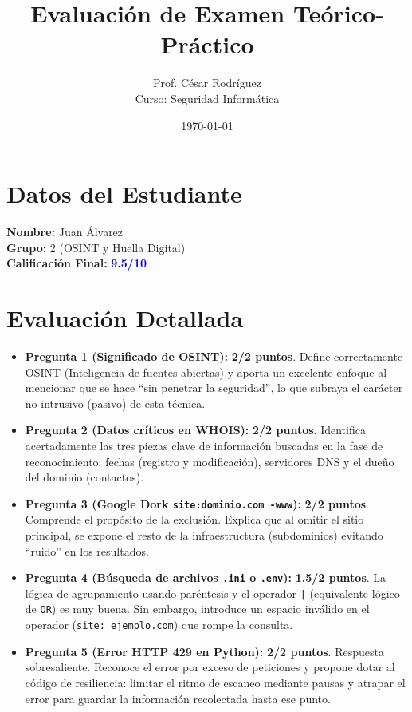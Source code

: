 \documentclass[12pt,a4paper]{article}
\title{Evaluación de Examen Teórico-Práctico}
\author{Prof. César Rodríguez \\ \small Curso: Seguridad Informática}
\date{\today}
\begin{document}
\maketitle

\section*{Datos del Estudiante}
\textbf{Nombre:} Juan Álvarez \\
\textbf{Grupo:} 2 (OSINT y Huella Digital) \\
\textbf{Calificación Final:} \textbf{\textcolor{blue}{9.5/10}}

\section*{Evaluación Detallada}

\begin{itemize}[label=$\bullet$]
    \item \textbf{Pregunta 1 (Significado de OSINT):} \textbf{2/2 puntos}. Define correctamente OSINT (Inteligencia de fuentes abiertas) y aporta un excelente enfoque al mencionar que se hace ``sin penetrar la seguridad'', lo que subraya el carácter no intrusivo (pasivo) de esta técnica.
    
    \item \textbf{Pregunta 2 (Datos críticos en WHOIS):} \textbf{2/2 puntos}. Identifica acertadamente las tres piezas clave de información buscadas en la fase de reconocimiento: fechas (registro y modificación), servidores DNS y el dueño del dominio (contactos).
    
    \item \textbf{Pregunta 3 (Google Dork \texttt{site:dominio.com -www}):} \textbf{2/2 puntos}. Comprende el propósito de la exclusión. Explica que al omitir el sitio principal, se expone el resto de la infraestructura (subdominios) evitando ``ruido'' en los resultados.
    
    \item \textbf{Pregunta 4 (Búsqueda de archivos \texttt{.ini} o \texttt{.env}):} \textbf{1.5/2 puntos}. La lógica de agrupamiento usando paréntesis y el operador \texttt{|} (equivalente lógico de \texttt{OR}) es muy buena. Sin embargo, introduce un espacio inválido en el operador (\texttt{site: ejemplo.com}) que rompe la consulta.
    
    \item \textbf{Pregunta 5 (Error HTTP 429 en Python):} \textbf{2/2 puntos}. Respuesta sobresaliente. Reconoce el error por exceso de peticiones y propone dotar al código de resiliencia: limitar el ritmo de escaneo mediante pausas y atrapar el error para guardar la información recolectada hasta ese punto.
\end{itemize}
\end{document}
